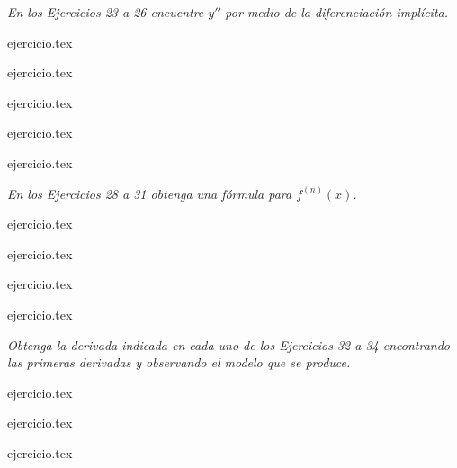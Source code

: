 \noindent \textit{En los Ejercicios 23 a 26 encuentre $y''$ por medio de la diferenciación implícita.}

\begin{enumerate}
    \begin{minipage}{0.45\textwidth}
    \setcounter{enumi}{22}
    {ejercicio.tex}
    \addtocounter{enumi}{1}
    {ejercicio.tex}
    \end{minipage}%
    \begin{minipage}{0.45\textwidth}
    \setcounter{enumi}{23}
    {ejercicio.tex}
    \addtocounter{enumi}{1}
    {ejercicio.tex}
    \end{minipage}
\end{enumerate}

\begin{enumerate}
    \setcounter{enumi}{26}
    {ejercicio.tex}
\end{enumerate}

\noindent \textit{En los Ejercicios 28 a 31 obtenga una fórmula para $f^{(n)}(x)$.}

\begin{enumerate}
    \begin{minipage}{0.45\textwidth}
    \setcounter{enumi}{27}
    {ejercicio.tex}
    \addtocounter{enumi}{1}
    {ejercicio.tex}
    \end{minipage}%
    \begin{minipage}{0.45\textwidth}
    \setcounter{enumi}{28}
    {ejercicio.tex}
    \addtocounter{enumi}{1}
    {ejercicio.tex}
    \end{minipage}
\end{enumerate}

\noindent \textit{Obtenga la derivada indicada en cada uno de los Ejercicios 32 a 34 encontrando las primeras derivadas y observando el modelo que se produce.}

\begin{enumerate}
    \begin{minipage}{0.3\textwidth}
    \setcounter{enumi}{31}
    {ejercicio.tex}
    \end{minipage}%
    \begin{minipage}{0.3\textwidth}
    \setcounter{enumi}{32}
    {ejercicio.tex}
    \end{minipage}%
    \begin{minipage}{0.3\textwidth}
    \setcounter{enumi}{33}
    {ejercicio.tex}
    \end{minipage}
\end{enumerate}

